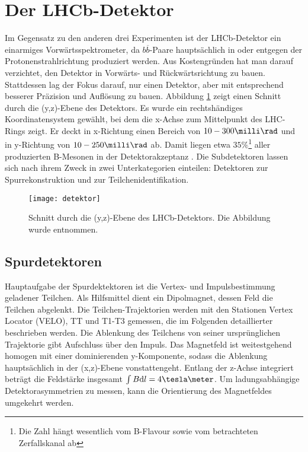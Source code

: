 \section{Der LHCb-Detektor}
Im Gegensatz zu den anderen drei Experimenten ist der LHCb-Detektor ein einarmiges Vorwärtsspektrometer, da $b\overline{b}$-Paare hauptsächlich in oder entgegen der Protonenstrahlrichtung produziert werden. Aus Kostengründen hat man darauf verzichtet, den Detektor in Vorwärts- und Rückwärtsrichtung zu bauen. Stattdessen lag der Fokus darauf, nur einen Detektor, aber mit entsprechend besserer Präzision und Auflösung zu bauen.  Abbildung \ref{fig:detektor} zeigt einen Schnitt durch die (y,z)-Ebene des Detektors. Es wurde ein rechtshändiges Koordinatensystem gewählt, bei dem die x-Achse zum Mittelpunkt des LHC-Rings zeigt. Er deckt in x-Richtung einen Bereich von $10-300\milli\rad$ und in y-Richtung von $10-250\milli\rad$ ab. Damit liegen etwa $35\%$\footnote{Die Zahl hängt wesentlich vom B-Flavour sowie vom betrachteten Zerfallskanal ab} aller produzierten B-Mesonen in der Detektorakzeptanz \cite{detektorakzeptanz}. Die Subdetektoren lassen sich nach ihrem Zweck in zwei Unterkategorien einteilen: Detektoren zur Spurrekonstruktion und zur Teilchenidentifikation.

\begin{figure}[hptb]
\centering
\texttt{[image: detektor]}
\caption{Schnitt durch die (y,z)-Ebene des LHCb-Detektors. Die Abbildung wurde \cite{detector} entnommen.}
\label{fig:detektor}
\end{figure}


\subsection{Spurdetektoren}
Hauptaufgabe der Spurdektektoren ist die Vertex- und Impulsbestimmung geladener Teilchen. Als Hilfsmittel dient ein Dipolmagnet, dessen Feld die Teilchen abgelenkt. Die Teilchen-Trajektorien werden mit den Stationen Vertex Locator (VELO), TT und T1-T3 gemessen, die im Folgenden detaillierter beschrieben werden. Die Ablenkung des Teilchens von seiner ursprünglichen Trajektorie gibt Aufschluss über den Impuls. Das Magnetfeld ist weitestgehend homogen mit einer dominierenden y-Komponente, sodass die Ablenkung hauptsächlich in der (x,z)-Ebene vonstattengeht. Entlang der z-Achse integriert beträgt die Feldstärke insgesamt $\int B\mathrm{d}l = 4\tesla\meter$. Um ladungsabhängige Detektorasymmetrien zu messen, kann die Orientierung des Magnetfeldes umgekehrt werden. \cite{thesis_linn}

